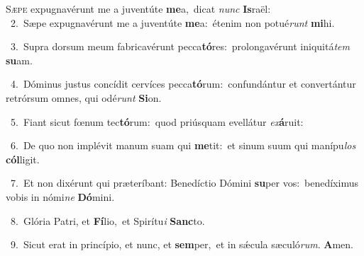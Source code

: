 \lettrine{\initial\textcolor{\initialcolor}{S}}{æpe} expugnavérunt me a juventúte \textbf{me}\-a,~\star dicat \textit{nunc} \textbf{Is}\-raël:\\
{\numbfont\textcolor{\numbcolor}{~2.}}~Sæpe expugnavérunt me a juventúte \textbf{me}\-a:~\star étenim non potué\textit{runt} \textbf{mi}\-hi.\par
{\numbfont\textcolor{\numbcolor}{~3.}}~Supra dorsum meum fabricavérunt pecca\-\textbf{tó}\-res:~\star prolongavérunt iniquitá\textit{tem} \textbf{su}\-am.\par
{\numbfont\textcolor{\numbcolor}{~4.}}~Dóminus justus concídit cervíces pecca\-\textbf{tó}\-rum:~\star confundántur et convertántur retrórsum omnes, qui odé\textit{runt} \textbf{Si}\-on.\par
{\numbfont\textcolor{\numbcolor}{~5.}}~Fiant sicut fœnum tec\-\textbf{tó}\-rum:~\star quod priúsquam evellátur \textit{ex}\-\textbf{á}ruit:\par
{\numbfont\textcolor{\numbcolor}{~6.}}~De quo non implévit manum suam qui \textbf{me}\-tit:~\star et sinum suum qui manípu\textit{los} \textbf{cól}\-ligit.\par
{\numbfont\textcolor{\numbcolor}{~7.}}~Et non dixérunt qui præteríbant: Benedíctio Dómini \textbf{su}\-per vos:~\star benedíximus vobis in nómi\textit{ne} \textbf{Dó}\-mini.\par
{\numbfont\textcolor{\numbcolor}{~8.}}~Glória Patri, et \textbf{Fí}\-lio,~\star et Spirítu\textit{i} \textbf{Sanc}\-to.\par
{\numbfont\textcolor{\numbcolor}{~9.}}~Sicut erat in princípio, et nunc, et \textbf{sem}\-per,~\star et in sǽcula sæculó\-\textit{rum}\-. \textbf{A}\-men.\par
